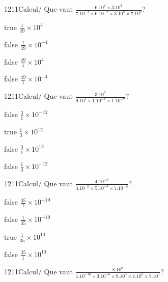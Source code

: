             \begin{question}{1211}{Calcul}{}{/}
                Que vaut $\frac{6.10^{2}\times 3.10^{2}}{7.10^{-3}\times 6.10^{-5}\times 3.10^{8}\times 7.10^{0}}$?
            \end{question}
            \begin{reponses}
                \item[true] $\frac{1}{49}\times 10^{4}$
                \item[false] $\frac{1}{49}\times 10^{-4}$
                \item[false] $\frac{49}{1}\times 10^{4}$
                \item[false] $\frac{49}{1}\times 10^{-4}$
            \end{reponses}
            \begin{question}{1211}{Calcul}{}{/}
                Que vaut $\frac{3.10^{5}}{9.10^{1}\times 1.10^{-1}\times 1.10^{-7}}$?
            \end{question}
            \begin{reponses}
                \item[false] $\frac{3}{1}\times 10^{-12}$
                \item[true] $\frac{1}{3}\times 10^{12}$
                \item[false] $\frac{3}{1}\times 10^{12}$
                \item[false] $\frac{1}{3}\times 10^{-12}$
            \end{reponses}
            \begin{question}{1211}{Calcul}{}{/}
                Que vaut $\frac{4.10^{-9}}{4.10^{-6}\times 5.10^{-4}\times 7.10^{-9}}$?
            \end{question}
            \begin{reponses}
                \item[false] $\frac{35}{1}\times 10^{-10}$
                \item[false] $\frac{1}{35}\times 10^{-10}$
                \item[true] $\frac{1}{35}\times 10^{10}$
                \item[false] $\frac{35}{1}\times 10^{10}$
            \end{reponses}
            \begin{question}{1211}{Calcul}{}{/}
                Que vaut $\frac{8.10^{8}}{1.10^{-10}\times 3.10^{-6}\times 9.10^{3}\times 7.10^{9}\times 7.10^{3}}$?
            \end{question}
